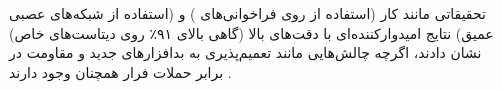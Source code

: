 تحقیقاتی مانند کار \textcite{ZhangNix2017} (استفاده از  روی فراخوانی‌های ) و \textcite{Vinayakumar2019} (استفاده از شبکه‌های عصبی عمیق) نتایج امیدوارکننده‌ای با دقت‌های بالا (گاهی بالای ۹۱٪ روی دیتاست‌های خاص) نشان دادند، اگرچه چالش‌هایی مانند تعمیم‌پذیری به بدافزارهای جدید و مقاومت در برابر حملات فرار همچنان وجود دارند \cite{Demontis2017}.


























